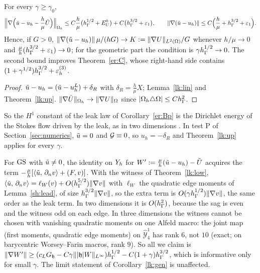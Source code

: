 \begin{corollary}\label{lk:gen}
For every $\gamma\ge\gamma_0$,
\[
\Bigl\|\nabla\Bigl(\tilde u-u_h-\frac h\mu\tilde U\Bigr)\Bigr\|_{\Omega_h}\le C\frac h\mu\bigl(h_\Gamma^{1/2}+E^0_U\bigr)+C\bigl(h_\Gamma^{3/2}+\varepsilon_1\bigr),\qquad
\lVert \nabla(\tilde u-u_h)\rVert\le C\Bigl(\frac h\mu+h_\Gamma^{3/2}+\varepsilon_1\Bigr).
\]
Hence, if $G>0$, $\lVert \nabla(\tilde u-u_h)\rVert\,\mu/(hG)\to K:=\lVert \nabla U\rVert_{L^2(\Omega)}/G$ whenever $h/\mu\to0$ and $\frac\mu h(h_\Gamma^{3/2}+\varepsilon_1)\to0$; for the geometric part the condition is $\gamma h_\Gamma^{1/2}\to0$. The second bound improves Theorem~\ref{er:C}, whose right-hand side contains $(1+\gamma^{1/2})h_\Gamma^{3/2}+\varepsilon_h^{(3)}$.
\end{corollary}
\begin{proof}
$\tilde u-u_h=(\tilde u-u^L_h)+\delta_R$ with $\delta_R=\frac h\mu X$; Lemma~\ref{lk:lin} and Theorem~\ref{lk:up}. $\lVert \nabla\tilde U\rVert_{\Omega_h}\to\lVert \nabla U\rVert_\Omega$ since $|\Omega_h\triangle\Omega|\le Ch_\Gamma^2$.
\end{proof}
So the $H^1$ constant of the leak law of Corollary~\ref{er:Bp} is the Dirichlet energy of the Stokes flow driven by the leak, as in two dimensions \cite{PadhiLong2D}. In test P of Section~\ref{sec:numerics}, $\tilde u=0$ and $\mathcal G\equiv0$, so $u_h=-\delta_R$ and Theorem~\ref{lk:up} applies for every $\gamma$.

\begin{remark}\label{lk:rem:gen}
For $\mathrm{GS}$ with $\tilde u\ne0$, the identity on $Y_h$ for $W':=\frac\mu h(\tilde u-u_h)-\tilde U$ acquires the term $-\frac\mu h[\langle \tilde u,\, \partial_n v\rangle+(F,v)]$. With the witness of Theorem~\ref{lk:low}, $\langle \tilde u,\, \partial_n v\rangle=\ell_W(v)+O(h_\Gamma^{5/2})\lVert \nabla v\rVert$ with $\ell_W$ the quadratic edge moments of Lemma~\ref{sh:lead}, of size $h_\Gamma^{3/2}\lVert \nabla v\rVert$, so the extra term is $O(\gamma h_\Gamma^{1/2})\lVert \nabla v\rVert$, the same order as the leak term. In two dimensions it is $O(h_\Gamma^2)$, because the sag is even and the witness odd on each edge. In three dimensions the witness cannot be chosen with vanishing quadratic moments on one Alfeld macro: the joint map (first moments, quadratic edge moments) on $\hat{\mathcal Y}^1_4$ has rank $6$, not $10$ (exact; on barycentric Worsey--Farin macros, rank $9$). So all we claim is $\lVert \nabla W'\rVert\ge(c_LG_\mathfrak h-C\gamma\lVert |\mathfrak h|W\rVert_{L^\infty})h_\Gamma^{1/2}-C(1+\gamma)h_\Gamma^{3/2}$, which is informative only for small $\gamma$. The limit statement of Corollary~\ref{lk:gen} is unaffected.
\end{remark}

